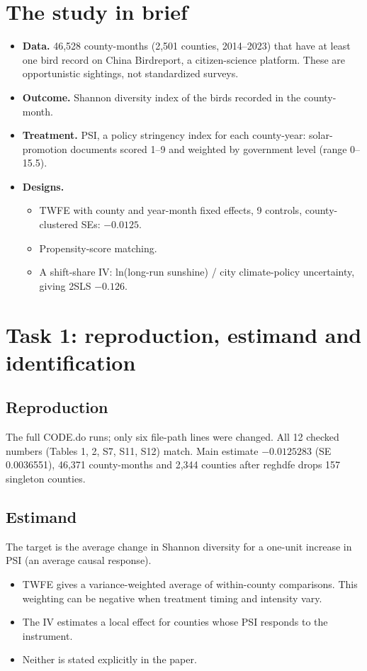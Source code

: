 \documentclass[11pt]{article}
\begin{document}
\section{The study in brief}
\begin{itemize}
\item \textbf{Data.} 46,528 county-months (2,501 counties, 2014--2023) that have at least one bird record on China Birdreport, a citizen-science platform. These are opportunistic sightings, not standardized surveys.
\item \textbf{Outcome.} Shannon diversity index of the birds recorded in the county-month.
\item \textbf{Treatment.} PSI, a policy stringency index for each county-year: solar-promotion documents scored 1--9 and weighted by government level (range 0--15.5).
\item \textbf{Designs.}
  \begin{itemize}
  \item TWFE with county and year-month fixed effects, 9 controls, county-clustered SEs: $-0.0125$.
  \item Propensity-score matching.
  \item A shift-share IV: ln(long-run sunshine) / city climate-policy uncertainty, giving 2SLS $-0.126$.
  \end{itemize}
\end{itemize}

\section{Task 1: reproduction, estimand and identification}
\subsection{Reproduction}
The full CODE.do runs; only six file-path lines were changed. All 12 checked numbers (Tables 1, 2, S7, S11, S12) match. Main estimate $-0.0125283$ (SE 0.0036551), 46,371 county-months and 2,344 counties after reghdfe drops 157 singleton counties.

\subsection{Estimand}
The target is the average change in Shannon diversity for a one-unit increase in PSI (an average causal response).
\begin{itemize}
\item TWFE gives a variance-weighted average of within-county comparisons. This weighting can be negative when treatment timing and intensity vary.
\item The IV estimates a local effect for counties whose PSI responds to the instrument.
\item Neither is stated explicitly in the paper.
\end{itemize}
\end{document}
